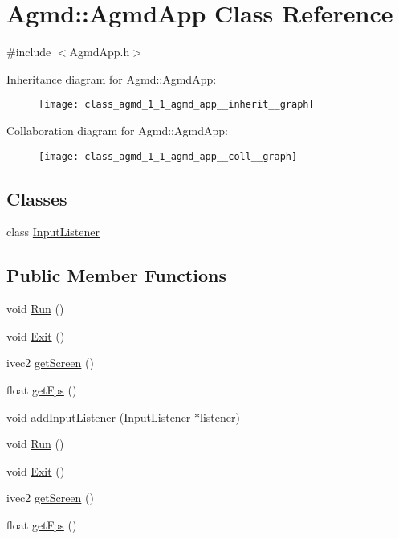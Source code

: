 \hypertarget{class_agmd_1_1_agmd_app}{\section{Agmd\+:\+:Agmd\+App Class Reference}
\label{class_agmd_1_1_agmd_app}
}


{\ttfamily \#include $<$Agmd\+App.\+h$>$}



Inheritance diagram for Agmd\+:\+:Agmd\+App\+:\nopagebreak
\begin{figure}[H]
\begin{center}
\leavevmode
\texttt{[image: class\_agmd\_1\_1\_agmd\_app\_\_inherit\_\_graph]}
\end{center}
\end{figure}


Collaboration diagram for Agmd\+:\+:Agmd\+App\+:\nopagebreak
\begin{figure}[H]
\begin{center}
\leavevmode
\texttt{[image: class\_agmd\_1\_1\_agmd\_app\_\_coll\_\_graph]}
\end{center}
\end{figure}
\subsection*{Classes}
\begin{DoxyCompactItemize}
\item 
class \hyperlink{class_agmd_1_1_agmd_app_1_1_input_listener}{Input\+Listener}
\end{DoxyCompactItemize}
\subsection*{Public Member Functions}
\begin{DoxyCompactItemize}
\item 
void \hyperlink{class_agmd_1_1_agmd_app_ae9893d63db9a73d8adee883fb0ea8282}{Run} ()
\item 
void \hyperlink{class_agmd_1_1_agmd_app_a6150fa7d962c30ac4b6e82b01ed686a6}{Exit} ()
\item 
ivec2 \hyperlink{class_agmd_1_1_agmd_app_a968b39722e8c8149787f6f4ba907e086}{get\+Screen} ()
\item 
float \hyperlink{class_agmd_1_1_agmd_app_ab2aac56da7c2f7071b1e2d60a287a3e9}{get\+Fps} ()
\item 
void \hyperlink{class_agmd_1_1_agmd_app_a1d0cbb731acee2cffb6be5d415140a7c}{add\+Input\+Listener} (\hyperlink{class_agmd_1_1_agmd_app_1_1_input_listener}{Input\+Listener} $\ast$listener)
\item 
void \hyperlink{class_agmd_1_1_agmd_app_ae9893d63db9a73d8adee883fb0ea8282}{Run} ()
\item 
void \hyperlink{class_agmd_1_1_agmd_app_a6150fa7d962c30ac4b6e82b01ed686a6}{Exit} ()
\item 
ivec2 \hyperlink{class_agmd_1_1_agmd_app_a968b39722e8c8149787f6f4ba907e086}{get\+Screen} ()
\item 
float \hyperlink{class_agmd_1_1_agmd_app_ab2aac56da7c2f7071b1e2d60a287a3e9}{get\+Fps} ()
\end{DoxyCompactItemize}
